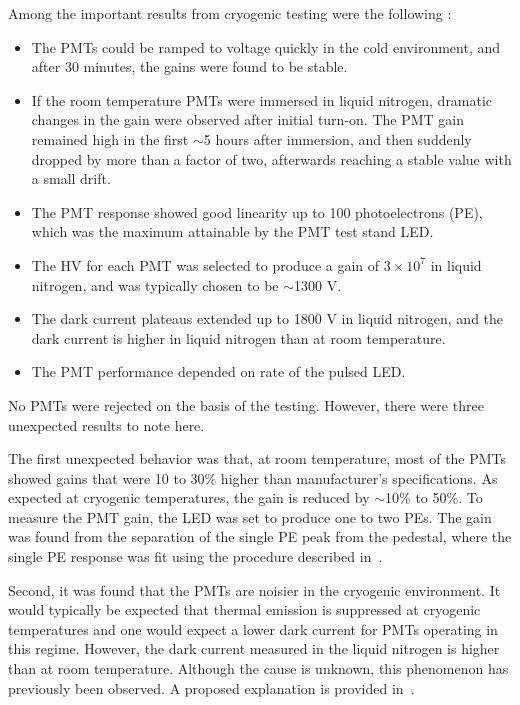 Among the important results from cryogenic testing  were the following \cite{Briese:2013wua}:
\begin{itemize}
\item The PMTs could be ramped to voltage quickly in the cold environment, 
and after 30 minutes, the gains were found to be stable.
\item If the room temperature PMTs were immersed in liquid nitrogen, 
dramatic changes in the gain were observed after initial turn-on. 
The PMT gain remained high in the first $\sim$5 hours after immersion, 
and then suddenly dropped by more than a factor of two, 
afterwards reaching a stable value with a small drift.
\item The PMT response showed good linearity up to 100 photoelectrons (PE), 
which was the maximum attainable by the PMT test stand LED.  
\item The HV for each PMT was selected to produce a gain of $3\times 10^7$ in liquid nitrogen,
and was typically chosen to be $\sim$1300 V.
\item The dark current plateaus extended up to 1800 V in liquid nitrogen, and the dark current is higher in liquid nitrogen than at room temperature.
\item The PMT performance depended on rate of the pulsed LED.  
\end{itemize}
No PMTs were rejected on the basis of the testing.  
However, there were three unexpected results to note here.


The first unexpected behavior was that, at room temperature, 
most of the PMTs showed gains that were 10 to 30\% higher than manufacturer's specifications.
As expected at cryogenic temperatures, the gain is reduced by $\sim$10\% to 50\%.
To measure the PMT gain, the LED was set to produce one to two PEs.  
The gain was found from the separation of the single PE peak from the pedestal, where the single PE response was fit using the procedure described in~\cite{Bellamy:1994bv}.   

Second, it was found that the PMTs are noisier in the cryogenic environment. 
It would typically be expected that thermal emission is suppressed at cryogenic temperatures and one would expect a lower dark current 
for PMTs operating in this regime.  
However, the dark current measured in the liquid nitrogen is higher than at room temperature. 
Although the cause is unknown, this phenomenon has previously been observed\cite{Meyer:2008qb}. A proposed explanation is provided in~\cite{MeyerDark}.

